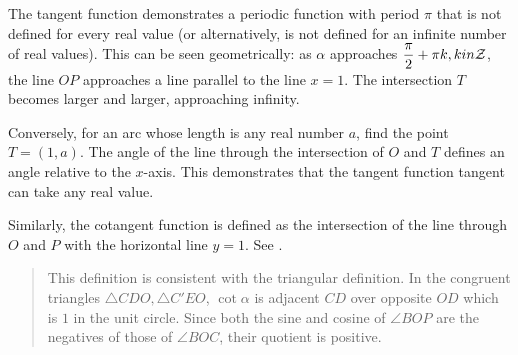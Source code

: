 The tangent function demonstrates a periodic function with period $\pi$ that is not defined for every real value (or alternatively, is not defined for an infinite number of real values). This can be seen geometrically: as $\alpha$ approaches $\displaystyle\frac{\pi}{2}+\pi k, k in \mathcal{Z}$, the line $OP$ approaches a line parallel to the line $x=1$. The intersection $T$ becomes larger and larger, approaching infinity.

Conversely, for an arc whose length is any real number $a$, find the point $T=(1,a)$. The angle of the line through the intersection of $O$ and $T$ defines an angle relative to the $x$-axis.
This demonstrates that the tangent function tangent can take any real value.

Similarly, the cotangent function is defined as the intersection of the line through $O$ and $P$ with the horizontal line $y = 1$. See .

\begin{quote}
This definition is consistent with the triangular definition. In the congruent triangles $\triangle CDO,\triangle C'EO$, $\cot \alpha$ is adjacent $CD$ over opposite $OD$ which is $1$ in the unit circle. Since both the sine and cosine of $\angle BOP$ are the negatives of those of $\angle BOC$, their quotient is positive.
\end{quote}


